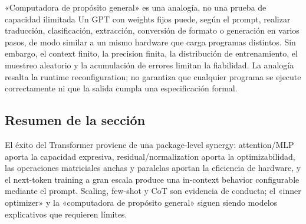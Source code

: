 
\begin{importantbox}{«Computadora de propósito general» es una analogía, no una prueba de capacidad ilimitada}
Un GPT con weights fijos puede, según el prompt, realizar traducción, clasificación, extracción, conversión de formato o generación en varios pasos, de modo similar a un mismo hardware que carga programas distintos. Sin embargo, el context finito, la precision finita, la distribución de entrenamiento, el muestreo aleatorio y la acumulación de errores limitan la fiabilidad. La analogía resalta la runtime reconfiguration; no garantiza que cualquier programa se ejecute correctamente ni que la salida cumpla una especificación formal.
\end{importantbox}


\subsection{Resumen de la sección}

El éxito del Transformer proviene de una package-level synergy: attention/MLP aporta la capacidad expresiva, residual/normalization aporta la optimizabilidad, las operaciones matriciales anchas y paralelas aportan la eficiencia de hardware, y el next-token training a gran escala produce una in-context behavior configurable mediante el prompt. Scaling, few-shot y CoT son evidencia de conducta; el «inner optimizer» y la «computadora de propósito general» siguen siendo modelos explicativos que requieren límites.
